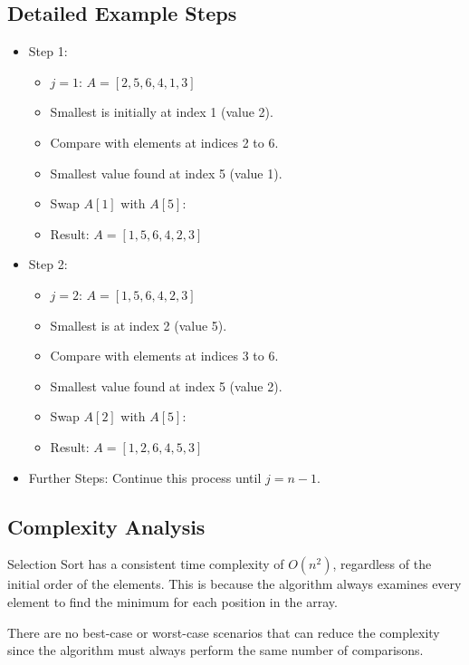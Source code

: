     \subsection{Detailed Example Steps}
    \begin{itemize}
        \item Step 1: \begin{itemize}
            \item \( j = 1 \): \( A = [2, 5, 6, 4, 1, 3] \)
            \item Smallest is initially at index 1 (value 2).
            \item Compare with elements at indices 2 to 6.
            \item Smallest value found at index 5 (value 1).
            \item Swap \( A[1] \) with \( A[5] \):
            \item Result: \( A = [1, 5, 6, 4, 2, 3] \)
        \end{itemize}
        \item Step 2: \begin{itemize}
            \item \( j = 2 \): \( A = [1, 5, 6, 4, 2, 3] \)
            \item Smallest is at index 2 (value 5).
            \item Compare with elements at indices 3 to 6.
            \item Smallest value found at index 5 (value 2).
            \item Swap \( A[2] \) with \( A[5] \):
            \item Result: \( A = [1, 2, 6, 4, 5, 3] \)
        \end{itemize}
        \item Further Steps: Continue this process until \( j = n-1 \).
    \end{itemize}
    
    \subsection{Complexity Analysis}
    Selection Sort has a consistent time complexity of \( O(n^2) \), regardless of the initial order of the elements. This is because the algorithm always examines every element to find the minimum for each position in the array.
    
    There are no best-case or worst-case scenarios that can reduce the complexity since the algorithm must always perform the same number of comparisons.
    
